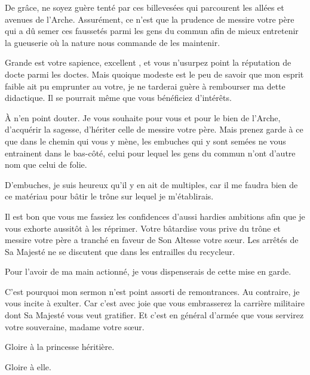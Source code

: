 \begin{drama}
  De grâce, ne soyez guère tenté par ces billevesées qui parcourent les allées et avenues de l’Arche. Assurément, ce n’est que la prudence de messire votre père qui a dû semer ces faussetés parmi les gens du commun afin de mieux entretenir la gueuserie où la nature nous commande de les maintenir.

  \elenaspeaks Grande est votre sapience, excellent \alexas{}, et vous n’usurpez point la réputation de docte parmi les doctes. Mais quoique modeste est le peu de savoir que mon esprit faible ait pu emprunter au votre, je ne tarderai guère à rembourser ma dette didactique. Il se pourrait même que vous bénéficiez d’intérêts.

  \alexasspeaks À n’en point douter. Je vous souhaite pour vous et pour le bien de l’Arche, d’acquérir la sagesse, d’hériter celle de messire votre père. Mais prenez garde à ce que dans le chemin qui vous y mène, les embuches qui y sont semées  ne vous entrainent dans le bas-côté, celui pour lequel les gens du commun n’ont d’autre nom que celui de folie. 

  \elenaspeaks D’embuches, %
  je suis heureux qu’il y en ait de multiples, car %
  il me faudra bien de ce matériau pour bâtir le trône sur lequel je m’établirais.

  \alexasspeaks Il est bon que vous me fassiez les confidences d’aussi hardies ambitions afin que je vous exhorte aussitôt à les réprimer. Votre bâtardise vous prive du trône et messire votre père a tranché en faveur de Son Altesse votre sœur. Les arrêtés de Sa Majesté ne se discutent que dans les entrailles du recycleur.

  \elenaspeaks Pour l’avoir de ma main actionné, je vous dispenserais de cette mise en garde.

  \alexasspeaks C’est pourquoi mon sermon n’est point assorti de remontrances. Au contraire, je vous incite à exulter.
  Car c’est avec joie que vous embrasserez la carrière militaire dont Sa Majesté vous veut gratifier. Et c’est en général d’armée que vous servirez votre souveraine, madame votre sœur.

  \elenaspeaks Gloire à la princesse héritière.

  \alexasspeaks Gloire à elle.

\end{drama}

